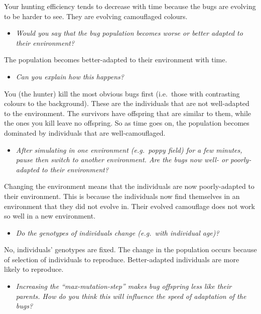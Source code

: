 \documentclass[
  a4paper]{book}
\providecommand{\tightlist}{%
  \setlength{\itemsep}{0pt}\setlength{\parskip}{0pt}}
\begin{document}
Your hunting efficiency tends to decrease with time because the bugs are evolving to be harder to see. They are evolving camouflaged colours.

\begin{itemize}
\tightlist
\item
  \emph{Would you say that the bug population becomes worse or better adapted to their environment?}
\end{itemize}

The population becomes better-adapted to their environment with time.

\begin{itemize}
\tightlist
\item
  \emph{Can you explain how this happens?}
\end{itemize}

You (the hunter) kill the most obvious bugs first (i.e.~those with contrasting colours to the background). These are the individuals that are not well-adapted to the environment. The survivors have offspring that are similar to them, while the ones you kill leave no offspring. So as time goes on, the population becomes dominated by individuals that are well-camouflaged.

\begin{itemize}
\tightlist
\item
  \emph{After simulating in one environment (e.g.~poppy field) for a few minutes, pause then switch to another environment. Are the bugs now well- or poorly-adapted to their environment?}
\end{itemize}

Changing the environment means that the individuals are now poorly-adapted to their environment. This is because the individuals now find themselves in an environment that they did not evolve in. Their evolved camouflage does not work so well in a new environment.

\begin{itemize}
\tightlist
\item
  \emph{Do the genotypes of individuals change (e.g.~with individual age)?}
\end{itemize}

No, individuals' genotypes are fixed. The change in the population occurs because of selection of individuals to reproduce. Better-adapted individuals are more likely to reproduce.

\begin{itemize}
\tightlist
\item
  \emph{Increasing the ``max-mutation-step'' makes bug offspring less like their parents. How do you think this will influence the speed of adaptation of the bugs?}
\end{itemize}
\end{document}
